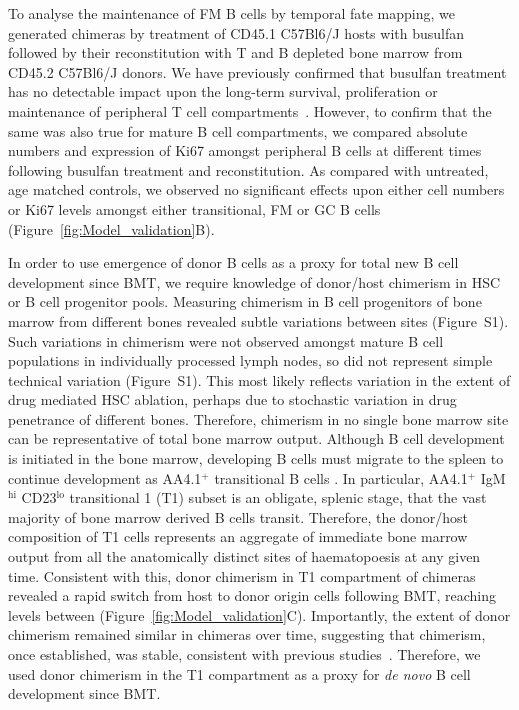 \documentclass[12pt]{article}
\newcommand{\superscript}[1]{\ensuremath{^{\textrm{#1}}}} %
\newcommand{\red}[1]{{\color{red}{#1}}}
\begin{document}
To analyse the maintenance of FM B cells by temporal fate mapping, we generated chimeras by treatment of CD45.1 C57Bl6/J hosts with busulfan followed by their reconstitution with T and B depleted bone marrow from CD45.2 C57Bl6/J donors. We have previously confirmed that busulfan treatment has no detectable impact upon the long-term survival, proliferation or maintenance of peripheral T cell compartments~\citep{Gossel:2017iu,Hogan:2015bd}. However, to confirm that the same was also true for mature B cell compartments, we compared absolute numbers and expression of Ki67 amongst peripheral B cells at different times following busulfan treatment  and  reconstitution.  As compared with untreated, age matched controls, we observed no significant effects upon either cell numbers or Ki67 levels amongst either transitional, FM or GC B cells (Figure~\ref{fig:Model_validation}B).

In order to use emergence of donor B cells as a proxy for total new B cell development since BMT, 
we require knowledge of donor/host chimerism in HSC or B cell progenitor pools. Measuring chimerism in B cell progenitors of bone marrow from different bones revealed subtle variations between sites (Figure~S1). Such variations in chimerism were not observed amongst mature B cell populations in individually processed lymph nodes, so did not represent simple technical variation (Figure~S1). This most likely reflects variation in the extent of drug mediated HSC ablation, perhaps due to stochastic variation in drug penetrance of different bones. Therefore, chimerism in no single bone marrow site can be representative of total bone marrow output. Although B cell development is initiated in the bone marrow,  developing B cells must migrate to the spleen to continue development as AA4.1\superscript{+} transitional B cells \red{(ref)}. In particular, AA4.1\superscript{+} IgM\superscript{hi} CD23\superscript{lo} transitional 1 (T1) subset is an obligate, splenic stage, that the vast majority of bone marrow derived B cells  transit.  Therefore, the donor/host composition of T1 cells represents an aggregate of immediate bone marrow output from all the anatomically distinct sites of haematopoesis at any given time. Consistent with this,  donor chimerism in T1 compartment of chimeras revealed a rapid switch from host to donor origin cells following BMT, reaching levels between \red{X and Y\% }(Figure~\ref{fig:Model_validation}C). Importantly, the extent of donor chimerism remained similar in chimeras over time, suggesting that chimerism, once established, was stable, consistent with previous studies~\citep{Hogan:2015bd}. Therefore, we used donor chimerism in the T1 compartment as a proxy for \textit{de novo} B cell development since BMT. %
\end{document}
